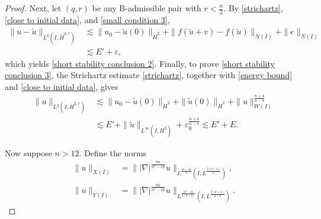 \documentclass[11pt,a4paper]{article}
\numberwithin{equation}{section}
\begin{document}
\begin{proof}
Next, let $(q, r)$ be any B-admissible pair with $r < \frac{n}{2}$. By \eqref{strichartz}, \eqref{close to initial data}, and \eqref{small condition 3},
\begin{align*}
\|u - \tilde{u}\|_{L^{q}(I, \dot{H}^{2, r})}
&\lesssim \|u_{0} - \tilde{u}(0)\|_{\dot{H}^{2}} + \|f(\tilde{u} + v) - f(\tilde{u}) \|_{N(I)} + \|e\|_{N(I)} \\
&\lesssim E' + \varepsilon,
\end{align*}
which yields \eqref{short stability conclusion 2}. Finally, to prove \eqref{short stability conclusion 3}, the Strichartz estimate \eqref{strichartz}, together with \eqref{energy bound} and \eqref{close to initial data}, gives
\begin{align*}
\|u \|_{L^{q}(I, \dot{H}^{2, r})}
&\lesssim \|u_{0} - \tilde{u}(0)\|_{\dot{H}^{2}} + \|\tilde{u}(0)\|_{\dot{H}^{2}} + \|u\|_{W(I)}^{\frac{n + 4}{n - 4}} \\
&\lesssim E' + \|\tilde{u}\|_{L^{\infty}(I, \dot{H^{2}})} + \varepsilon_{0}^{\frac{n + 4}{n - 4}}
\lesssim E' + E.
\end{align*}

Now suppose $n > 12$. Define the norms
\begin{align*}
\|u\|_{X(I)} &= \||\nabla|^{\frac{8n}{n^{2} - 16}}u\|_{L^{\frac{n^{2} - 16}{8}}(I, L^{\frac{2(n+4)}{n}})}, \\
\|u\|_{Y(I)} &= \||\nabla|^{\frac{8n}{n^{2} - 16}}u\|_{L^{\frac{n^{2} - 16}{4(n-2)}}(I, L^{\frac{2(n+4)}{n + 8}})}.
\end{align*}


\end{proof}
\end{document}
